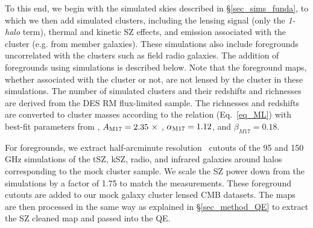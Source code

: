To this end, we begin with the simulated skies described in \S\ref{sec_sims_funda}, to which we then add simulated clusters, including the lensing signal (only the {\it 1-halo} term), thermal and kinetic SZ effects, and emission associated with the cluster (e.g. from member galaxies). %
These simulations also include foregrounds uncorrelated with the clusters such as field radio galaxies.
The addition of foregrounds using  simulations is described below. 
Note that the foreground maps, whether associated with the cluster or not, are not lensed by the cluster in these simulations. 
The number of simulated clusters and their redshifts and richnesses are derived from the  DES RM \whichyear{} flux-limited sample. 
The richnesses and redshifts are converted to cluster masses according to the \ML{} relation (Eq.~\ref{eq_ML}) with best-fit parameters from \citet{melchoir17}, $A_{\rm M17} = 2.35\ \times$ \munits, $\alpha_{\rm M17} = 1.12$, and $\beta_{M17} = 0.18$.  

For foregrounds, we extract half-arcminute resolution \boxsize\ cutouts of the 95 and 150 GHz  simulations of the tSZ, kSZ, radio, and infrared galaxies around halos corresponding to the mock cluster sample. %
We scale the SZ power down from the  simulations by a factor of 1.75 to match the \citet{george15} measurements.
These foreground cutouts are added to our mock galaxy cluster lensed CMB datasets. %
The maps are then processed in the same way as explained in \S\ref{sec_method_QE} to extract the SZ cleaned map and passed into the QE. 


